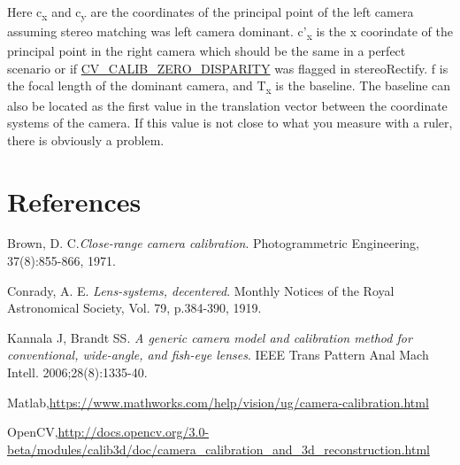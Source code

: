 \documentclass{article}
\begin{document}
Here c\textsubscript{x} and c\textsubscript{y} are the coordinates of the principal point of the left camera assuming stereo matching was left camera dominant. c'\textsubscript{x} is the x coorindate of the principal point in the right camera which should be the same in a perfect scenario or if \url{CV_CALIB_ZERO_DISPARITY} was flagged in stereoRectify. f is the focal length of the dominant camera, and T\textsubscript{x} is the baseline. The baseline can also be located as the first value in the translation vector between the coordinate systems of the camera. If this value is not close to what you measure with a ruler, there is obviously a problem. 

\section{References}

\begin{thebibliography}{9}
Brown, D. C.\textit{Close-range camera calibration}.
Photogrammetric Engineering, 37(8):855-866, 1971.

Conrady, A. E.
\textit{Lens-systems, decentered}.
Monthly Notices of the Royal Astronomical Society, Vol. 79, p.384-390, 1919.

Kannala J, Brandt SS. 
\textit{A generic camera model and calibration method for conventional, wide-angle, and fish-eye lenses}. IEEE Trans Pattern Anal Mach Intell. 2006;28(8):1335-40.

Matlab,\url{https://www.mathworks.com/help/vision/ug/camera-calibration.html}

OpenCV,\url{http://docs.opencv.org/3.0-beta/modules/calib3d/doc/camera_calibration_and_3d_reconstruction.html}

\end{thebibliography}
	
\end{document}
